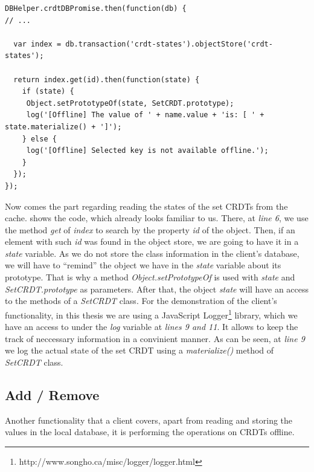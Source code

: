 \begin{lstlisting}[caption={Reading CRDT states from client's cache.}, label={lst:dev10}]
DBHelper.crdtDBPromise.then(function(db) {
// ...

  var index = db.transaction('crdt-states').objectStore('crdt-states');

  return index.get(id).then(function(state) {
    if (state) {
     Object.setPrototypeOf(state, SetCRDT.prototype);
     log('[Offline] The value of ' + name.value + 'is: [ ' + state.materialize() + ']');
    } else {
     log('[Offline] Selected key is not available offline.');
    }
  });
});
\end{lstlisting}

Now comes the part regarding reading the states of the set CRDTs from the cache.  shows the code, which already looks familiar to us. There, at \textit{line 6}, we use the method \textit{get} of \textit{index} to search by the property \textit{id} of the object. Then, if an element with such \textit{id} was found in the object store, we are going to have it in a \textit{state} variable. As we do not store the class information in the client's database, we will have to ``remind'' the object we have in the \textit{state} variable about its prototype. That is why a method \textit{Object.setPrototypeOf} is used with \textit{state} and \textit{SetCRDT.prototype} as parameters. After that, the object \textit{state} will have an access to the methods of a \textit{SetCRDT} class. For the demonstration of the client's functionality, in this thesis we are using a JavaScript Logger\footnote{http://www.songho.ca/misc/logger/logger.html} library, which we have an access to under the \textit{log} variable at \textit{lines 9 and 11}. It allows to keep the track of neccessary information in a convinient manner. As can be seen, at \textit{line 9} we log the actual state of the set CRDT using a \textit{materialize()} method of \textit{SetCRDT} class.

\subsection*{Add / Remove}

Another functionality that a client covers, apart from reading and storing the values in the local database, it is performing the operations on CRDTs offline.

